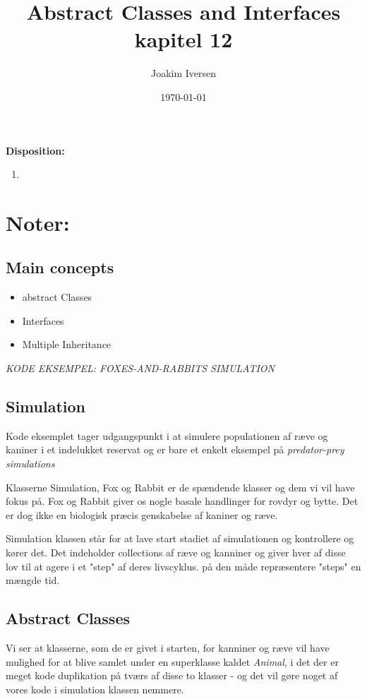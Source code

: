 \documentclass{article}
\title{Abstract Classes and Interfaces \\
        kapitel 12}
\author{Joakim Iversen}
\date{\today}
\begin{document}
\maketitle
\newpage

\textbf{\Large Disposition:}
\begin{enumerate}
    \item 
\end{enumerate}
\newpage

\section*{Noter:}
\subsection*{Main concepts}
\begin{itemize}
    \item abstract Classes
    \item Interfaces
    \item Multiple Inheritance
\end{itemize}
\begin{center}
    \textit{KODE EKSEMPEL: FOXES-AND-RABBITS SIMULATION}
\end{center}
\subsection*{Simulation}
Kode eksemplet tager udgangspunkt i at simulere populationen af ræve og kaniner i et indelukket reservat og er bare et enkelt eksempel på \textit{predator-prey simulations}

Klasserne Simulation, Fox og Rabbit er de spændende klasser og dem vi vil have fokus på. Fox og Rabbit giver os nogle basale handlinger for rovdyr og bytte. Det er dog ikke en biologisk præcis genskabelse af kaniner og ræve. 

Simulation klassen står for at lave start stadiet af simulationen og kontrollere og kører det. Det indeholder collections af ræve og kanniner og giver hver af disse lov til at agere i et "step" af deres livscyklus. på den måde repræsentere "steps" en mængde tid. 

\subsection*{Abstract Classes}
Vi ser at klasserne, som de er givet i starten, for kanniner og ræve vil have mulighed for at blive samlet under en superklasse kaldet \textit{Animal}, i det der er meget kode duplikation på tværs af disse to klasser - og det vil gøre noget af vores kode i simulation klassen nemmere. 
\end{document}
